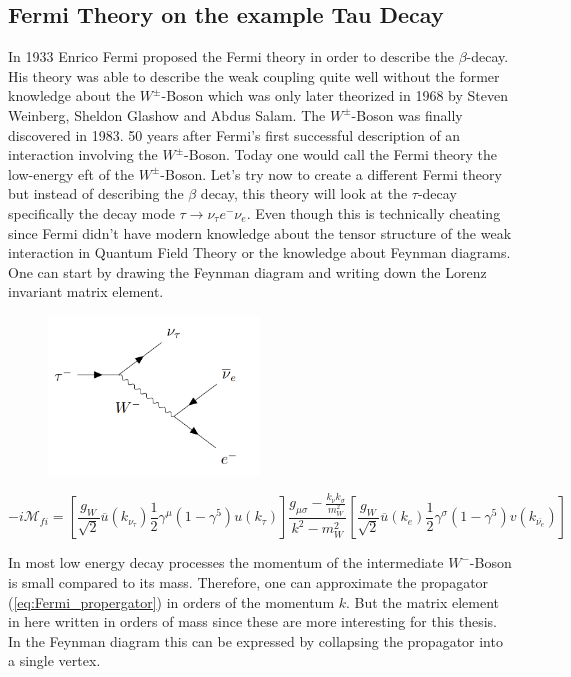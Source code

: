\documentclass[../Bachelorarbeit.tex]{subfiles}
\begin{document}
\subsection{Fermi Theory on the example Tau Decay}
\label{sec:Fermi}
In 1933 Enrico Fermi proposed the Fermi theory in order to describe the $\beta$-decay. His theory was able to describe the
weak coupling quite well without the former knowledge about the $W^{\pm}$-Boson which was only later theorized in 1968 by Steven Weinberg, Sheldon Glashow and Abdus Salam.
The $W^{\pm}$-Boson was finally discovered in 1983. 50 years after Fermi's first successful description of an interaction involving the $W^{\pm}$-Boson.
Today one would call the Fermi theory the low-energy \acrshort{eft} of the $W^{\pm}$-Boson.
Let's try now to create a different Fermi theory but instead of describing the $\beta$ decay\cite{Thomson.2013}, this theory will look at the $\tau$-decay specifically the decay mode $\tau \rightarrow \nu_{\tau}e^{-}\nu_{e}$.
Even though this is technically cheating since Fermi didn't have modern knowledge about the tensor structure of the weak interaction in Quantum Field Theory or the knowledge about Feynman diagrams.
One can start by drawing the Feynman diagram and writing down the Lorenz invariant matrix element.
\begin{figure}[h]
    \centering
    \includegraphics[width=0.5\textwidth]{images/Feynamn_tau_decay.PNG}
\end{figure}

\begin{equation}
    -i\mathcal{M}_{fi}= \left[ \frac{g_{W}}{\sqrt{2}} \overline{u}(k_{\nu_{\tau}})\frac{1}{2}\gamma^{\mu}(1-\gamma^{5})u(k_{\tau}) \right] \frac{g_{\mu\sigma}-\frac{k_{\nu}k_{\sigma}}{m_{W}^{2}}}{k^{2}-m_{W}^{2}} \left[ \frac{g_{W}}{\sqrt{2}} \overline{u}(k_{e})\frac{1}{2}\gamma^{\sigma}(1-\gamma^{5})v(k_{\overline{\nu_{e}}}) \right]
\end{equation}

In most low energy decay processes the momentum of the intermediate $W^{-}$-Boson is small compared to its mass. Therefore, one can approximate the
propagator (\ref{eq:Fermi_propergator}) in orders of the momentum $k$. But the matrix element in here written in orders
of mass since these are more interesting for this thesis. In the Feynman diagram this can be expressed by collapsing the propagator into a single vertex.
\end{document}
